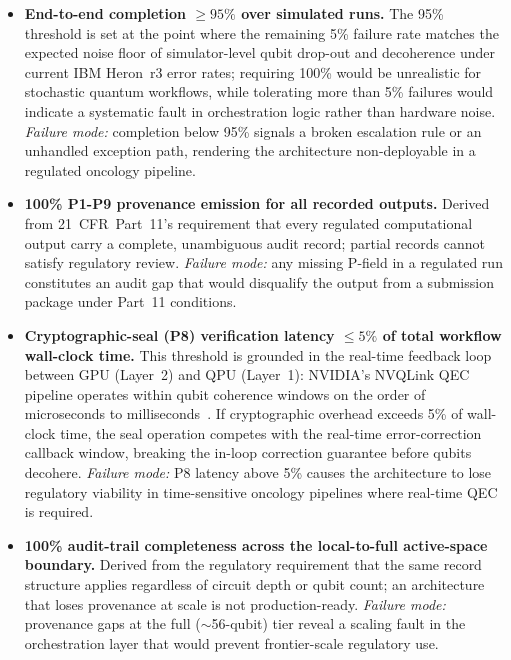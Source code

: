 \documentclass[11pt,letterpaper]{article}
\begin{document}
\begin{itemize}[leftmargin=1.5em,itemsep=4pt]

\item \textbf{End-to-end completion $\geq 95\%$ over simulated runs.}\;
The 95\% threshold is set at the point where the remaining 5\% failure rate matches the
expected noise floor of simulator-level qubit drop-out and decoherence under current
IBM Heron~r3 error rates; requiring 100\% would be unrealistic for stochastic quantum
workflows, while tolerating more than 5\% failures would indicate a systematic fault in
orchestration logic rather than hardware noise.
\textit{Failure mode:} completion below 95\% signals a broken escalation rule or an
unhandled exception path, rendering the architecture non-deployable in a regulated
oncology pipeline.

\item \textbf{100\% P1-P9 provenance emission for all recorded outputs.}\;
Derived from 21~CFR~Part~11's requirement that every regulated computational output carry
a complete, unambiguous audit record; partial records cannot satisfy regulatory review.
\textit{Failure mode:} any missing P-field in a regulated run constitutes an audit gap
that would disqualify the output from a submission package under Part~11 conditions.

\item \textbf{Cryptographic-seal (P8) verification latency $\leq 5\%$ of total workflow
wall-clock time.}\;
This threshold is grounded in the real-time feedback loop between GPU (Layer~2) and QPU
(Layer~1): NVIDIA's NVQLink QEC pipeline operates within qubit coherence windows on the
order of microseconds to milliseconds~\cite{cudaqec2026}.  If cryptographic overhead
exceeds 5\% of wall-clock time, the seal operation competes with the real-time
error-correction callback window, breaking the in-loop correction guarantee before qubits
decohere.
\textit{Failure mode:} P8 latency above 5\% causes the architecture to lose regulatory
viability in time-sensitive oncology pipelines where real-time QEC is required.

\item \textbf{100\% audit-trail completeness across the local-to-full active-space
boundary.}\;
Derived from the regulatory requirement that the same record structure applies regardless
of circuit depth or qubit count; an architecture that loses provenance at scale is not
production-ready.
\textit{Failure mode:} provenance gaps at the full ($\sim$56-qubit) tier reveal a scaling
fault in the orchestration layer that would prevent frontier-scale regulatory use.


\end{itemize}
\end{document}
